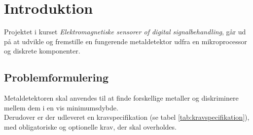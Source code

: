 \documentclass[../main.tex]{subfiles}
\begin{document}
\chapter{Introduktion}
Projektet i kurset \emph{Elektromagnetiske sensorer of digital signalbehandling}, går ud på at udvikle og fremstille en fungerende metaldetektor udfra en mikroprocessor og diskrete komponenter.

\section{Problemformulering}
Metaldetektoren skal anvendes til at finde forskellige metaller og diskriminere mellem dem i en vis minimumsdybde.\\
Derudover er der udleveret en kravspecifikation (se tabel \ref{tab:kravspecifikation}), med obligatoriske og optionelle krav, der skal overholdes.
\end{document}
